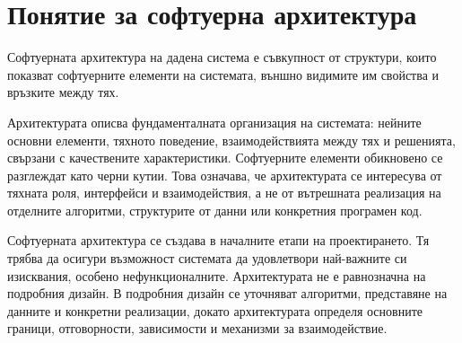 \begin{konspekt}
\end{konspekt}

\section{Понятие за софтуерна архитектура}\label{s:27.1}

\begin{defn}
Софтуерната архитектура на дадена система е съвкупност от структури, които показват софтуерните елементи на системата, външно видимите им свойства и връзките между тях.
\end{defn}

Архитектурата описва фундаменталната организация на системата: нейните основни елементи, тяхното поведение, взаимодействията между тях и решенията, свързани с качествените характеристики. Софтуерните елементи обикновено се разглеждат като черни кутии. Това означава, че архитектурата се интересува от тяхната роля, интерфейси и взаимодействия, а не от вътрешната реализация на отделните алгоритми, структурите от данни или конкретния програмен код.

Софтуерната архитектура се създава в началните етапи на проектирането. Тя трябва да осигури възможност системата да удовлетвори най-важните си изисквания, особено нефункционалните. Архитектурата не е равнозначна на подробния дизайн. В подробния дизайн се уточняват алгоритми, представяне на данните и конкретни реализации, докато архитектурата определя основните граници, отговорности, зависимости и механизми за взаимодействие.

